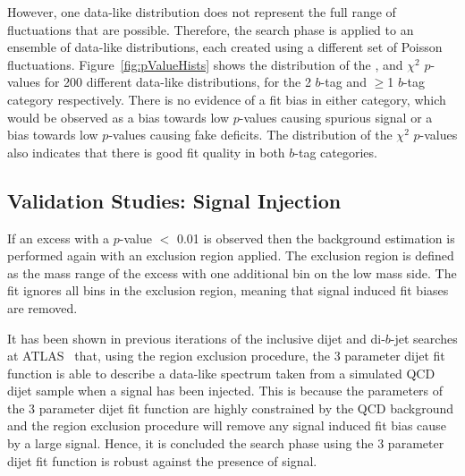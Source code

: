 However, one data-like distribution does not represent the full range of fluctuations that are possible.
Therefore, the search phase is applied to an ensemble of data-like distributions,
each created using a different set of Poisson fluctuations.
Figure~\ref{fig:pValueHists}  shows the distribution of
the \bh{}, \dhunt{} and $\chi^{2}$ \mbox{$p$-value}s for 200 different data-like distributions,
for the 2 $b$-tag and $\geq$1 $b$-tag category respectively.
There is no evidence of a fit bias in either category,
which would be observed as a bias towards low \bh{} \mbox{$p$-value}s causing spurious signal
or a bias towards low \dhunt{} \mbox{$p$-value}s causing fake deficits.
The distribution of the $\chi^{2}$ \mbox{$p$-value}s also indicates that there is good fit quality in both $b$-tag categories.



\subsection{Validation Studies: Signal Injection}
\label{sec:bkg-summer_sigInj}

If an excess with a  \bh{} $p$-value $<$ 0.01 is observed then the background estimation is
performed again with an exclusion region applied.
The exclusion region is defined as the mass range of the excess with one additional bin on the low mass side.
The fit ignores all bins in the exclusion region, meaning that signal induced fit biases are removed.

It has been shown in previous iterations of the inclusive dijet and di-$b$-jet searches at ATLAS~\cite{dijet-mori16_paper,dibjet-mori16_paper} that,
using the region exclusion procedure, the 3 parameter dijet fit function is able to describe a data-like spectrum taken from a simulated QCD dijet sample
when a signal has been injected.
This is because the parameters of the 3 parameter dijet fit function are highly constrained by the QCD background
and the region exclusion procedure will remove any signal induced fit bias cause by a large signal.
Hence, it is concluded the search phase using the 3 parameter dijet fit function is robust against the presence of signal.

